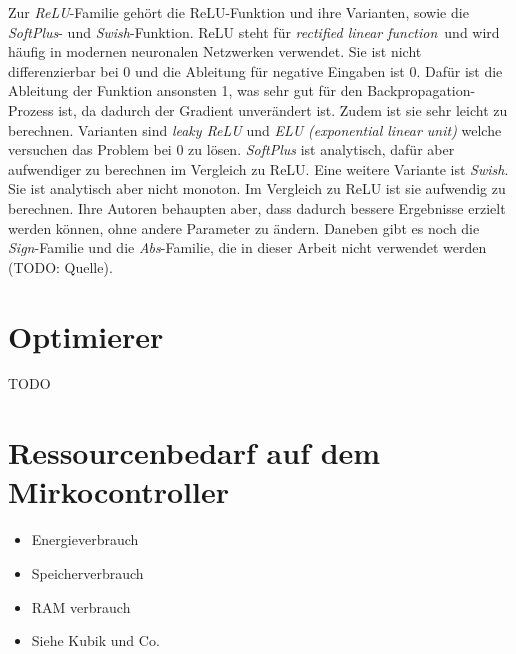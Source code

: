 \newline
\newline
Zur \textit{ReLU}-Familie gehört die ReLU-Funktion und ihre Varianten, sowie die \textit{SoftPlus}- und \textit{Swish}-Funktion.
ReLU steht für \glqq\textit{rectified linear function}\grqq\ und wird häufig in modernen neuronalen Netzwerken verwendet.
Sie ist nicht differenzierbar bei 0 und die Ableitung für negative Eingaben ist 0.
Dafür ist die Ableitung der Funktion ansonsten 1, was sehr gut für den Backpropagation-Prozess ist, da dadurch der Gradient unverändert ist.
Zudem ist sie sehr leicht zu berechnen.
Varianten sind \textit{leaky ReLU} und \textit{ELU (exponential linear unit)} welche versuchen das Problem bei 0 zu lösen.
\textit{SoftPlus} ist analytisch, dafür aber aufwendiger zu berechnen im Vergleich zu ReLU.
Eine weitere Variante ist \textit{Swish}. Sie ist analytisch aber nicht monoton.
Im Vergleich zu ReLU ist sie aufwendig zu berechnen.
Ihre Autoren behaupten aber, dass dadurch bessere Ergebnisse erzielt werden können, ohne andere Parameter zu ändern.
\newline
\newline
Daneben gibt es noch die \textit{Sign}-Familie und die \textit{Abs}-Familie, die in dieser Arbeit nicht verwendet werden (TODO: Quelle).

\section{Optimierer}
TODO

\section{Ressourcenbedarf auf dem Mirkocontroller}
\begin{itemize}
    \item Energieverbrauch
    \item Speicherverbrauch
    \item RAM verbrauch
    \item Siehe Kubik und Co.
\end{itemize}